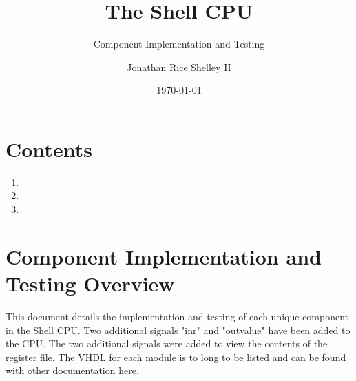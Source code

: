 \documentclass{article}
\subtitle{Component Implementation and Testing}
\title{The Shell CPU}
\author{Jonathan Rice Shelley II}
\date{\today}
\begin{document}
\maketitle

\section{Contents}
\begin{par}
	\begin{enumerate}
	\item {}
	\item {}
	\item {}
	\end{enumerate}
\end{par}

\section{Component Implementation and Testing Overview }
\label{overview}
\begin{par}
	This document details the implementation and testing of each unique component in the Shell CPU. Two additional signals "inr" and "outvalue" have been added to the CPU. The two additional signals were added to view the contents of the register file. The VHDL for each module is to long to be listed and can be found with other documentation \href{https://github.com/RiceShelley/ShellCPU}{here}. 
\end{par}

\newpage
\end{document}
